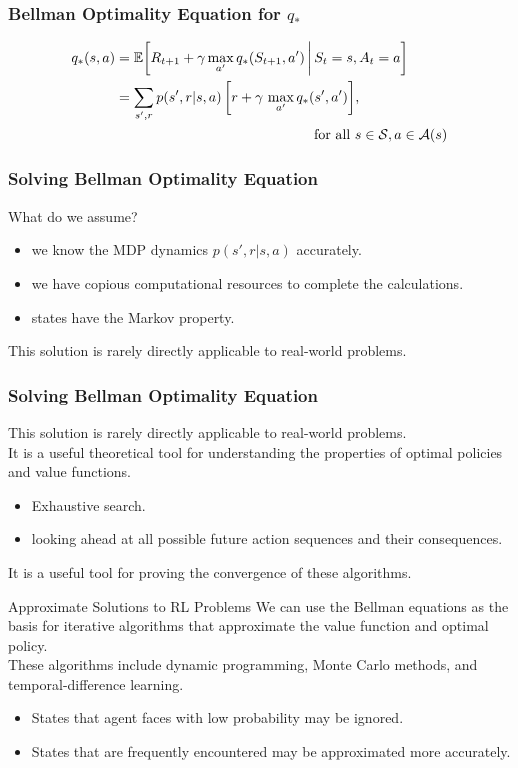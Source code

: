 \documentclass[12pt]{beamer}
\newcommand{\nl}{\vspace*{1em}\\}
\begin{document}
\begin{frame}\frametitle{{Bellman Optimality Equation for $q_*$}}
    \begin{align*}
    q_*(s, a) &= \mathbb{E}\bigg[R_{t+1} + \gamma \max\limits_{a'} q_*(S_{t+1}, a') \,\bigg|\, S_t = s, A_t = a\bigg] \nl
              &= \sum\limits_{s', r} p(s', r | s, a) \,\bigg[r + \gamma\, \max\limits_{a'} q_*(s', a') \bigg],\\
             & \hspace*{5cm} \text{for all } s \in \mathcal{S}, a \in \mathcal{A}(s)\\
    \end{align*}
\end{frame}


\begin{frame}\frametitle{Solving Bellman Optimality Equation}
    What do we assume?\nl
    \begin{itemize}
        \item we know the MDP dynamics $p(s', r | s, a)$ accurately.
        \item we have copious computational resources to complete the calculations.
        \item states have the Markov property.
    \end{itemize}

    This solution is rarely directly applicable to real-world problems.\nl
\end{frame}

\begin{frame}\frametitle{Solving Bellman Optimality Equation}
    This solution is rarely directly applicable to real-world problems.\nl
    It is a useful theoretical tool for understanding the properties of optimal policies and value functions.\nl
    \begin{itemize}
        \item Exhaustive search.
        \item looking ahead at all possible future action sequences and their consequences.
    \end{itemize}

    It is a useful tool for proving the convergence of these algorithms.
\end{frame}

\begin{frame}{Approximate Solutions to RL Problems}
    We can use the Bellman equations as the basis for iterative algorithms that approximate the value function and optimal policy.\nl

    These algorithms include dynamic programming, Monte Carlo methods, and temporal-difference learning.\nl
    \begin{itemize}
        \item States that agent faces with low probability may be ignored.
        \item States that are frequently encountered may be approximated more accurately.
    \end{itemize}
\end{frame}
\end{document}
